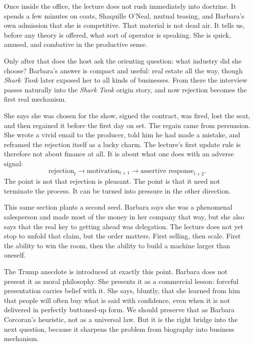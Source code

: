 Once inside the office, the lecture does not rush immediately into doctrine. It spends a few minutes on coats, Shaquille O'Neal, mutual teasing, and Barbara's own admission that she is competitive. That material is not dead air. It tells us, before any theory is offered, what sort of operator is speaking. She is quick, amused, and combative in the productive sense.

Only after that does the host ask the orienting question: what industry did she choose? Barbara's answer is compact and useful: real estate all the way, though \emph{Shark Tank} later exposed her to all kinds of businesses. From there the interview passes naturally into the \emph{Shark Tank} origin story, and now rejection becomes the first real mechanism.

She says she was chosen for the show, signed the contract, was fired, lost the seat, and then regained it before the first day on set. The regain came from persuasion. She wrote a vivid email to the producer, told him he had made a mistake, and reframed the rejection itself as a lucky charm. The lecture's first update rule is therefore not about finance at all. It is about what one does with an adverse signal:
\begin{equation}
\text{rejection}_t \longrightarrow \text{motivation}_{t+1} \longrightarrow \text{assertive response}_{t+2}.
\end{equation}
The point is not that rejection is pleasant. The point is that it need not terminate the process. It can be turned into pressure in the other direction.

This same section plants a second seed. Barbara says she was a phenomenal salesperson and made most of the money in her company that way, but she also says that the real key to getting ahead was delegation. The lecture does not yet stop to unfold that claim, but the order matters. First selling, then scale. First the ability to win the room, then the ability to build a machine larger than oneself.

The Trump anecdote is introduced at exactly this point. Barbara does not present it as moral philosophy. She presents it as a commercial lesson: forceful presentation carries belief with it. She says, bluntly, that she learned from him that people will often buy what is said with confidence, even when it is not delivered in perfectly buttoned-up form. We should preserve that as Barbara Corcoran's heuristic, not as a universal law. But it is the right bridge into the next question, because it sharpens the problem from biography into business mechanism.

